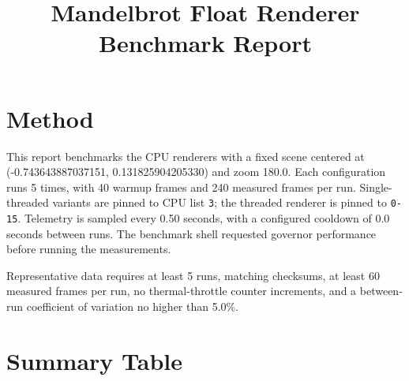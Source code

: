 \documentclass[11pt]{article}
\title{Mandelbrot Float Renderer Benchmark Report}
\begin{document}
\maketitle

\section*{Method}
This report benchmarks the CPU renderers with a fixed scene centered at
(-0.743643887037151, 0.131825904205330) and zoom 180.0. Each configuration runs
5 times, with 40 warmup frames and 240
measured frames per run. Single-threaded variants are pinned to CPU list
\texttt{3}; the threaded renderer is pinned to
\texttt{0-15}. Telemetry is sampled every
0.50 seconds, with a configured cooldown of
0.0 seconds between runs.
The benchmark shell requested governor {performance}
before running the measurements.

Representative data requires at least 5 runs, matching
checksums, at least 60 measured frames per run,
no thermal-throttle counter increments, and a between-run coefficient of variation no higher than
5.0\%.

\section*{Summary Table}
\end{document}
